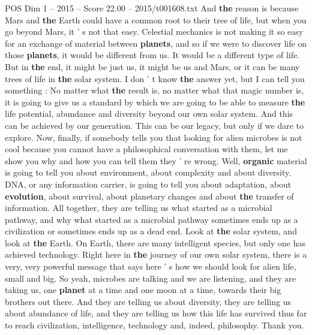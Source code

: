 \begin{textsample}{POS Dim 1 – 2015 – Score 22.00 – 2015/t001608.txt}
And \textbf{the} reason is because Mars and \textbf{the} Earth could have a common root to their tree of life, but when you go beyond Mars, it ' s not that easy.
Celestial mechanics is not making it so easy for an exchange of material between \textbf{planets}, and so if we were to discover life on those \textbf{planets}, it would be different from us.
It would be a different type of life.
But in \textbf{the} end, it might be just us, it might be us and Mars, or it can be many trees of life in \textbf{the} solar system.
I don ' t know \textbf{the} answer yet, but I can tell you something : No matter what \textbf{the} result is, no matter what that magic number is, it is going to give us a standard by which we are going to be able to measure \textbf{the} life potential, abundance and diversity beyond our own solar system.
And this can be achieved by our generation.
This can be our legacy, but only if we dare to explore.
Now, finally, if somebody tells you that looking for alien microbes is not cool because you cannot have a philosophical conversation with them, let me show you why and how you can tell them they ' re wrong.
Well, \textbf{organic} material is going to tell you about environment, about complexity and about diversity.
DNA, or any information carrier, is going to tell you about adaptation, about \textbf{evolution}, about survival, about planetary changes and about \textbf{the} transfer of information.
All together, they are telling us what started as a microbial pathway, and why what started as a microbial pathway sometimes ends up as a civilization or sometimes ends up as a dead end.
Look at \textbf{the} solar system, and look at \textbf{the} Earth.
On Earth, there are many intelligent species, but only one has achieved technology.
Right here in \textbf{the} journey of our own solar system, there is a very, very powerful message that says here ' s how we should look for alien life, small and big.
So yeah, microbes are talking and we are listening, and they are taking us, one \textbf{planet} at a time and one moon at a time, towards their big brothers out there.
And they are telling us about diversity, they are telling us about abundance of life, and they are telling us how this life has survived thus far to reach civilization, intelligence, technology and, indeed, philosophy.
Thank you.

\end{textsample}
